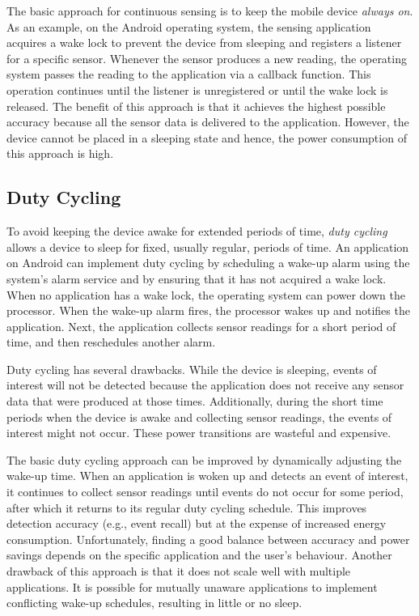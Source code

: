 The basic approach for continuous sensing is to keep the mobile device
\emph{always on}.  As an example, on the Android operating system, the sensing
application acquires a wake lock to prevent the device from sleeping and
registers a listener for a specific sensor.  Whenever the sensor produces a new
reading, the operating system passes the reading to the application via a
callback function.  This operation continues until the listener is unregistered
or until the wake lock is released.  The benefit of this approach is that it
achieves the highest possible accuracy because all the sensor data is delivered to the
application.  However, the device cannot be placed in a sleeping state and hence, the power
consumption of this approach is high.

\subsection{Duty Cycling}

To avoid keeping the device awake for extended periods of time, \emph{duty 
cycling} allows a device to sleep for fixed, usually regular, periods of
time.  An application on Android can implement duty cycling by scheduling a wake-up 
alarm using the system's alarm service and by ensuring that it has not
acquired a wake lock.  When no application has a wake lock, the operating system
can power down the processor.  When the wake-up alarm fires, the processor wakes 
up and notifies the application.  Next, the application collects sensor readings
for a short period of time, and then reschedules another alarm.

Duty cycling has several drawbacks.  While the device is sleeping, events of interest will not be 
detected because the application does not receive any sensor data that were produced at those 
times.  Additionally, during the short time periods when the device is awake and collecting 
sensor readings, the events of interest might not occur.  These power transitions are wasteful 
and expensive. 

The basic duty
cycling approach can be improved by dynamically adjusting the wake-up time.  When
an application is woken up and detects an event of interest, it continues to
collect sensor readings until events do not occur for some period, after which
it returns to its regular duty cycling schedule.  This improves detection
accuracy (e.g., event recall) but at the expense of increased energy
consumption.  Unfortunately, finding a good balance between accuracy and power
savings depends on the specific application and the user's behaviour.  Another
drawback of this approach is that it does not scale well with multiple
applications.  It is possible for mutually unaware applications to implement
conflicting wake-up schedules, resulting in little or no sleep.

